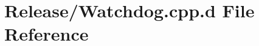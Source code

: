 \hypertarget{_release_2_watchdog_8cpp_8d}{\section{\-Release/\-Watchdog.cpp.\-d \-File \-Reference}
\label{_release_2_watchdog_8cpp_8d}
}
